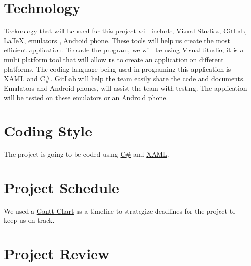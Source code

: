 \documentclass{article}
\begin{document}
\section{Technology}
Technology that will be used for this project will include, Visual Studios, GitLab, LaTeX, emulators , Android phone. These tools will help us create the most efficient application. To code the program, we will be using Visual Studio, it is a multi platform tool that will allow us to create an application on different platforms. The coding language being used in programing this application is XAML and C\#. GitLab will help the team easily share the code and documents. Emulators and Android phones, will assist the team with testing. The application will be tested on these emulators or an Android phone.

\section{Coding Style}
The project is going to be coded using \href{https://docs.microsoft.com/en-us/dotnet/csharp/programming-guide/inside-a-program/coding-conventions}{C\#} and \href{https://github.com/cmaneu/xaml-coding-guidelines/blob/master/README.md}{XAML}.

\section{Project Schedule}
We used a \href{run:../../ProjectSchedule/Team 12 Gantt Chart.gan}{Gantt Chart} as a timeline to strategize deadlines for the project to keep us on track. 

\section{Project Review}
\end{document}

